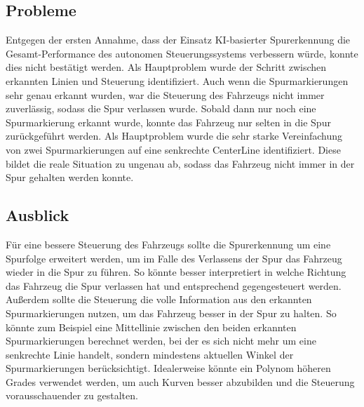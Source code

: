 \documentclass{article}
\begin{document}
        \subsection{Probleme}
        Entgegen der ersten Annahme, dass der Einsatz KI-basierter Spurerkennung die Gesamt-Performance des autonomen Steuerungssystems verbessern würde, konnte dies nicht bestätigt werden.
        Als Hauptproblem wurde der Schritt zwischen erkannten Linien und Steuerung identifiziert. Auch wenn die Spurmarkierungen sehr genau erkannt wurden, war die Steuerung des Fahrzeugs nicht immer zuverlässig, sodass die Spur verlassen wurde. Sobald dann nur noch eine Spurmarkierung erkannt wurde, konnte das Fahrzeug nur selten in die Spur zurückgeführt werden.
        Als Hauptproblem wurde die sehr starke Vereinfachung von zwei Spurmarkierungen auf eine senkrechte CenterLine identifiziert.
        Diese bildet die reale Situation zu ungenau ab, sodass das Fahrzeug nicht immer in der Spur gehalten werden konnte.

        \subsection{Ausblick}
        Für eine bessere Steuerung des Fahrzeugs sollte die Spurerkennung um eine Spurfolge erweitert werden, um im Falle des Verlassens der Spur das Fahrzeug wieder in die Spur zu führen. So könnte besser interpretiert in welche Richtung das Fahrzeug die Spur verlassen hat und entsprechend gegengesteuert werden.
        Außerdem sollte die Steuerung die volle Information aus den erkannten Spurmarkierungen nutzen, um das Fahrzeug besser in der Spur zu halten. So könnte zum Beispiel eine Mittellinie zwischen den beiden erkannten Spurmarkierungen berechnet werden, bei der es sich nicht mehr um eine senkrechte Linie handelt, sondern mindestens aktuellen Winkel der Spurmarkierungen berücksichtigt. Idealerweise könnte ein Polynom höheren Grades verwendet werden, um auch Kurven besser abzubilden und die Steuerung vorausschauender zu gestalten.
\end{document}
